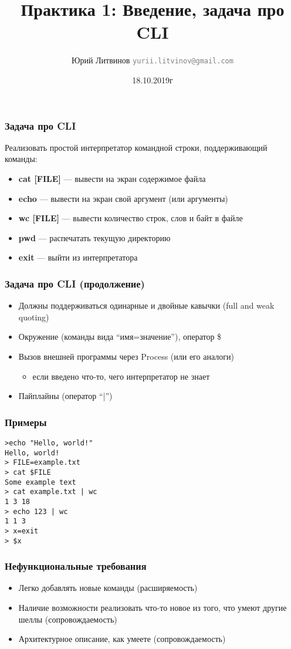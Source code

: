 \documentclass[xetex,mathserif,serif]{beamer}
\title{Практика 1: Введение, задача про CLI}
\author[Юрий Литвинов]{Юрий Литвинов \newline \textcolor{gray}{\small\texttt{yurii.litvinov@gmail.com}}}
\date{18.10.2019г}
\begin{document}
	
	\frame{\titlepage}
	
	\begin{frame}
		\frametitle{Задача про CLI}
		Реализовать простой интерпретатор командной строки, поддерживающий команды:
		\begin{itemize}
			\item \textbf{cat [FILE]} --- вывести на экран содержимое файла
			\item \textbf{echo} --- вывести на экран свой аргумент (или аргументы)
			\item \textbf{wc [FILE]} --- вывести количество строк, слов и байт в файле
			\item \textbf{pwd} --- распечатать текущую директорию
			\item \textbf{exit} --- выйти из интерпретатора
		\end{itemize}
	\end{frame}
	
	\begin{frame}
		\frametitle{Задача про CLI (продолжение)}
		\begin{itemize}
			\item Должны поддерживаться одинарные и двойные кавычки (full and weak quoting)
			\item Окружение (команды вида ``имя=значение''), оператор \$
			\item Вызов внешней программы через Process (или его аналоги)
			\begin{itemize}
				\item если введено что-то, чего интерпретатор не знает
			\end{itemize}
			\item Пайплайны (оператор ``|'')
		\end{itemize}
	\end{frame}
	
	\begin{frame}[fragile]
		\frametitle{Примеры}
\begin{verbatim}
>echo "Hello, world!"
Hello, world!
> FILE=example.txt
> cat $FILE
Some example text
> cat example.txt | wc
1 3 18
> echo 123 | wc
1 1 3
> x=exit
> $x
\end{verbatim}
\end{frame}

	\begin{frame}
		\frametitle{Нефункциональные требования}
		\begin{itemize}
			\item Легко добавлять новые команды (расширяемость)
			\item Наличие возможности реализовать что-то новое из того, что умеют другие шеллы (сопровождаемость)
			\item Архитектурное описание, как умеете (сопровождаемость)
		\end{itemize}
	\end{frame}
	
\end{document}
